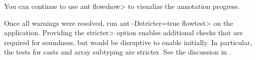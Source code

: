 You can continue to use \<ant flowshow> to visualize the annotation
progress.

Once all warnings were resolved, run \<ant -Dstricter=true flowtest> on
the application.
Providing the \<stricter> option enables additional checks that are
required for soundness, but would be disruptive to enable initially.
In particular, the tests for casts and array subtyping are stricter.
See the discussion in .
